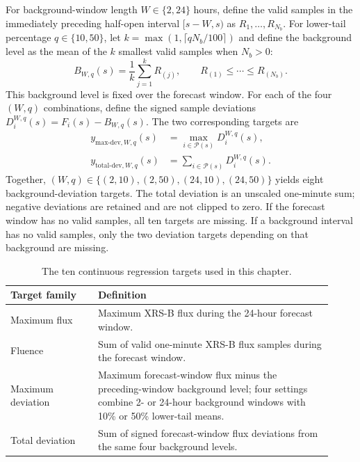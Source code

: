 \documentclass[12pt]{report}
\begin{document}
For background-window length $W\in\{2,24\}$ hours, define the valid samples in the immediately preceding half-open interval $[s-W,s)$ as $R_1,\ldots,R_{N_b}$. For lower-tail percentage $q\in\{10,50\}$, let $k=\max(1,\lceil qN_b/100\rceil)$ and define the background level as the mean of the $k$ smallest valid samples when $N_b>0$:
\begin{equation}
 B_{W,q}(s)=\frac{1}{k}\sum_{j=1}^{k} R_{(j)},
 \qquad R_{(1)}\le\cdots\le R_{(N_b)}.
\end{equation}
This background level is fixed over the forecast window. For each of the four $(W,q)$ combinations, define the signed sample deviations $D_i^{W,q}(s)=F_i(s)-B_{W,q}(s)$. The two corresponding targets are
\begin{align}
 y_{\mathrm{max\text{-}dev},W,q}(s)
 &=\max_{i\in\mathcal{P}(s)}D_i^{W,q}(s),\\
 y_{\mathrm{total\text{-}dev},W,q}(s)
 &=\sum_{i\in\mathcal{P}(s)}D_i^{W,q}(s).
\end{align}
Together, $(W,q)\in\{(2,10),(2,50),(24,10),(24,50)\}$ yields eight background-deviation targets. The total deviation is an unscaled one-minute sum; negative deviations are retained and are not clipped to zero. If the forecast window has no valid samples, all ten targets are missing. If a background interval has no valid samples, only the two deviation targets depending on that background are missing.

\begin{table}[ht]
    \centering
    \caption{The ten continuous regression targets used in this chapter.}
    \label{tab:project1-target-definitions}
    \small
    \begin{tabular}{p{0.25\linewidth}p{0.67\linewidth}}
        \toprule
        Target family & Definition \\
        \midrule
        Maximum flux & Maximum XRS-B flux during the 24-hour forecast window. \\
        Fluence & Sum of valid one-minute XRS-B flux samples during the forecast window. \\
        Maximum deviation & Maximum forecast-window flux minus the preceding-window background level; four settings combine 2- or 24-hour background windows with 10\% or 50\% lower-tail means. \\
        Total deviation & Sum of signed forecast-window flux deviations from the same four background levels. \\
        \bottomrule
    \end{tabular}
    \normalsize
\end{table}
\end{document}
